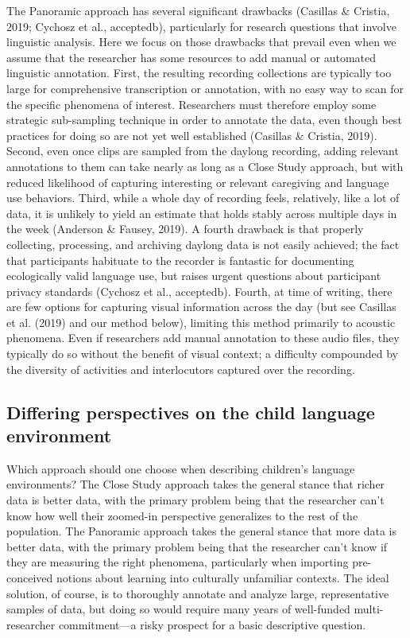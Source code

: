 \documentclass[,man,floatsintext]{apa6}
\begin{document}
The Panoramic approach has several significant drawbacks (Casillas \&
Cristia, 2019; Cychosz et al., acceptedb), particularly for research
questions that involve linguistic analysis. Here we focus on those
drawbacks that prevail even when we assume that the researcher has some
resources to add manual or automated linguistic annotation. First, the
resulting recording collections are typically too large for
comprehensive transcription or annotation, with no easy way to scan for
the specific phenomena of interest. Researchers must therefore employ
some strategic sub-sampling technique in order to annotate the data,
even though best practices for doing so are not yet well established
(Casillas \& Cristia, 2019). Second, even once clips are sampled from
the daylong recording, adding relevant annotations to them can take
nearly as long as a Close Study approach, but with reduced likelihood of
capturing interesting or relevant caregiving and language use behaviors.
Third, while a whole day of recording feels, relatively, like a lot of
data, it is unlikely to yield an estimate that holds stably across
multiple days in the week (Anderson \& Fausey, 2019). A fourth drawback
is that properly collecting, processing, and archiving daylong data is
not easily achieved; the fact that participants habituate to the
recorder is fantastic for documenting ecologically valid language use,
but raises urgent questions about participant privacy standards (Cychosz
et al., acceptedb). Fourth, at time of writing, there are few options
for capturing visual information across the day (but see Casillas et al.
(2019) and our method below), limiting this method primarily to acoustic
phenomena. Even if researchers add manual annotation to these audio
files, they typically do so without the benefit of visual context; a
difficulty compounded by the diversity of activities and interlocutors
captured over the recording.

\subsection{Differing perspectives on the child language
environment}\label{differing-perspectives-on-the-child-language-environment}

Which approach should one choose when describing children's language
environments? The Close Study approach takes the general stance that
richer data is better data, with the primary problem being that the
researcher can't know how well their zoomed-in perspective generalizes
to the rest of the population. The Panoramic approach takes the general
stance that more data is better data, with the primary problem being
that the researcher can't know if they are measuring the right
phenomena, particularly when importing pre-conceived notions about
learning into culturally unfamiliar contexts. The ideal solution, of
course, is to thoroughly annotate and analyze large, representative
samples of data, but doing so would require many years of well-funded
multi-researcher commitment---a risky prospect for a basic descriptive
question.
\end{document}
